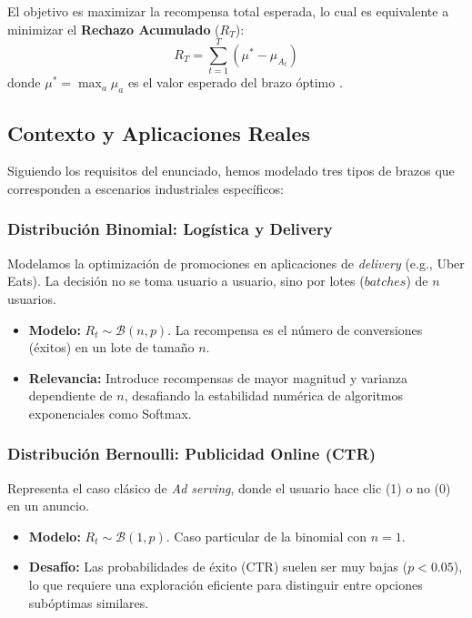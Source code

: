 \documentclass[a4paper,11pt]{article}
\begin{document}
El objetivo es maximizar la recompensa total esperada, lo cual es equivalente a minimizar el \textbf{Rechazo Acumulado} ($R_T$):
\begin{equation}
    R_T = \sum_{t=1}^{T} (\mu^* - \mu_{A_t})
\end{equation}
donde $\mu^* = \max_a \mu_a$ es el valor esperado del brazo óptimo \cite{lai1985}.

\subsection{Contexto y Aplicaciones Reales}
Siguiendo los requisitos del enunciado, hemos modelado tres tipos de brazos que corresponden a escenarios industriales específicos:

\subsubsection{Distribución Binomial: Logística y Delivery}
Modelamos la optimización de promociones en aplicaciones de \textit{delivery} (e.g., Uber Eats). La decisión no se toma usuario a usuario, sino por lotes ($batches$) de $n$ usuarios.
\begin{itemize}
    \item \textbf{Modelo:} $R_t \sim \mathcal{B}(n, p)$. La recompensa es el número de conversiones (éxitos) en un lote de tamaño $n$.
    \item \textbf{Relevancia:} Introduce recompensas de mayor magnitud y varianza dependiente de $n$, desafiando la estabilidad numérica de algoritmos exponenciales como Softmax.
\end{itemize}

\subsubsection{Distribución Bernoulli: Publicidad Online (CTR)}
Representa el caso clásico de \textit{Ad serving}, donde el usuario hace clic (1) o no (0) en un anuncio.
\begin{itemize}
    \item \textbf{Modelo:} $R_t \sim \mathcal{B}(1, p)$. Caso particular de la binomial con $n=1$.
    \item \textbf{Desafío:} Las probabilidades de éxito (CTR) suelen ser muy bajas ($p < 0.05$), lo que requiere una exploración eficiente para distinguir entre opciones subóptimas similares.
\end{itemize}
\end{document}

